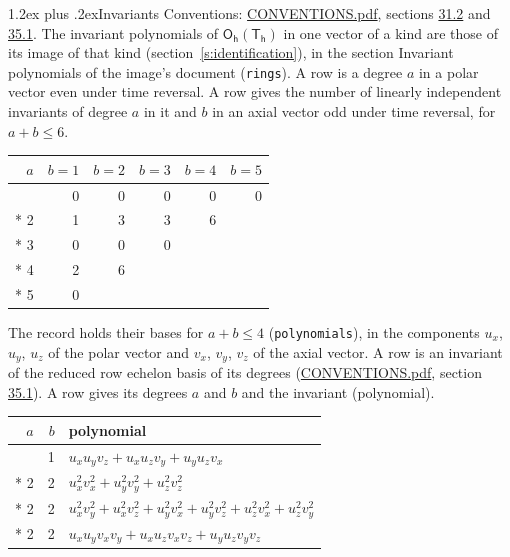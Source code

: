 \documentclass[10pt,a4paper]{article}
\makeatletter
\renewcommand\section{\@startsection{section}{1}{\z@}{-3ex plus -1ex minus -.2ex}%
  {1.2ex plus .2ex}{\normalfont\large\sffamily\bfseries\color{parttitle}}}
\numberwithin{equation}{section}
\newcommand{\grp}[1]{\mathsf{#1}}
\makeatother
\begin{document}
\section{Invariants}\label{s:invariants}
Conventions: \href{../../CONVENTIONS.pdf}{CONVENTIONS.pdf}, sections \href{../../CONVENTIONS.pdf\#conv.31.2}{31.2} and \href{../../CONVENTIONS.pdf\#conv.35.1}{35.1}.
The invariant polynomials of $\grp{O_{h}}(\grp{T_{h}})$ in one vector of a kind are those of its image of that kind (section~\ref{s:identification}), in the section Invariant polynomials of the image's document (\texttt{rings}).
\leavevmode\label{n:index.degree.polar}\label{n:index.degree.axial}A row is a degree $a$ in a polar vector even under time reversal. A row gives the number of linearly independent invariants of degree $a$ in it and $b$ in an axial vector odd under time reversal, for $a + b \le 6$.
{\small\begin{longtable}{@{}rrrrrr@{}}\toprule
$a$ & $b = 1$ & $b = 2$ & $b = 3$ & $b = 4$ & $b = 5$\\\midrule\endhead
\bottomrule\endfoot\endlastfoot
1 & 0 & 0 & 0 & 0 & 0\\*
2 & 1 & 3 & 3 & 6 & \\*
3 & 0 & 0 & 0 &  & \\*
4 & 2 & 6 &  &  & \\*
5 & 0 &  &  &  & \\
\bottomrule\end{longtable}}
\leavevmode\label{n:local.component.polar}\label{n:local.component.axial}The record holds their bases for $a + b \le 4$ (\texttt{polynomials}), in the components $u_{x}$, $u_{y}$, $u_{z}$ of the polar vector and $v_{x}$, $v_{y}$, $v_{z}$ of the axial vector. \label{n:head.polynomial}A row is an invariant of the reduced row echelon basis of its degrees (\href{../../CONVENTIONS.pdf}{CONVENTIONS.pdf}, section \href{../../CONVENTIONS.pdf\#conv.35.1}{35.1}). A row gives its degrees $a$ and $b$ and the invariant (polynomial).
{\small\renewcommand{\arraystretch}{1.2}\begin{longtable}{@{}rrl@{}}\toprule
$a$ & $b$ & polynomial\\\midrule\endhead
\bottomrule\endfoot\endlastfoot
2 & 1 & $u_{x}u_{y}v_{z} + u_{x}u_{z}v_{y} + u_{y}u_{z}v_{x}$\\*
2 & 2 & $u_{x}^{2}v_{x}^{2} + u_{y}^{2}v_{y}^{2} + u_{z}^{2}v_{z}^{2}$\\*
2 & 2 & $u_{x}^{2}v_{y}^{2} + u_{x}^{2}v_{z}^{2} + u_{y}^{2}v_{x}^{2} + u_{y}^{2}v_{z}^{2} + u_{z}^{2}v_{x}^{2} + u_{z}^{2}v_{y}^{2}$\\*
2 & 2 & $u_{x}u_{y}v_{x}v_{y} + u_{x}u_{z}v_{x}v_{z} + u_{y}u_{z}v_{y}v_{z}$\\
\bottomrule\end{longtable}}
\end{document}

